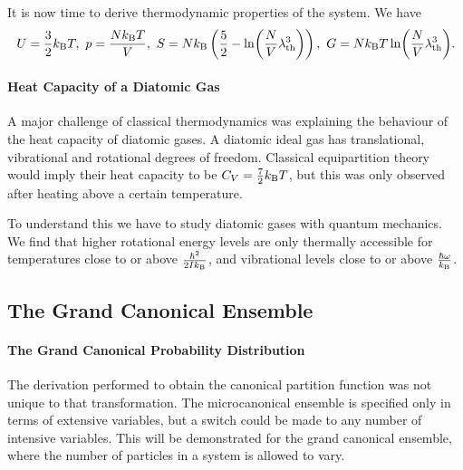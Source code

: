 It is now time to derive thermodynamic properties of the system. We have
\begin{align*}
	U = \frac{3}{2}\kb T,\ p = \frac{N\kb T}{V},\ S = N\kb\left(\frac{5}{2} - \ln(\frac{N}{V}\lambda_{\text{th}}^{3})\right),\ G = N\kb T\ln(\frac{N}{V}\lambda_{\text{th}}^{3}).
\end{align*}

\paragraph{Heat Capacity of a Diatomic Gas}
A major challenge of classical thermodynamics was explaining the behaviour of the heat capacity of diatomic gases. A diatomic ideal gas has translational, vibrational and rotational degrees of freedom. Classical equipartition theory would imply their heat capacity to be $C_{V} = \frac{7}{2}k_{\text{B}} T$, but this was only observed after heating above a certain temperature.

To understand this we have to study diatomic gases with quantum mechanics. We find that higher rotational energy levels are only thermally accessible for temperatures close to or above $\frac{\hbar^{2}}{2Ik_{\text{B}}}$, and vibrational levels close to or above $\frac{\hbar\omega}{k_{\text{B}}}$.

\subsection{The Grand Canonical Ensemble}

\paragraph{The Grand Canonical Probability Distribution}
The derivation performed to obtain the canonical partition function was not unique to that transformation. The microcanonical ensemble is specified only in terms of extensive variables, but a switch could be made to any number of intensive variables. This will be demonstrated for the grand canonical ensemble, where the number of particles in a system is allowed to vary.


